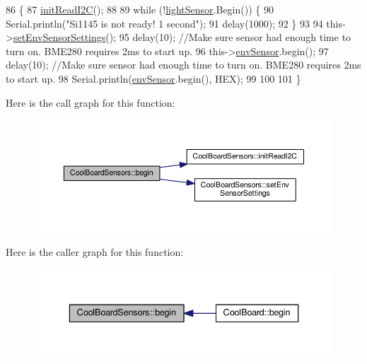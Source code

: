 \begin{DoxyCode}
86 \{       
87     \hyperlink{classCoolBoardSensors_acad6a8418c66d36868caca23c844ecb6}{initReadI2C}();
88 
89     \textcolor{keywordflow}{while} (!\hyperlink{classCoolBoardSensors_a3e397300fb707dd193e909a757bf6102}{lightSensor}.Begin()) \{
90       Serial.println(\textcolor{stringliteral}{"Si1145 is not ready!  1 second"});
91       delay(1000);
92     \}
93      
94     this->\hyperlink{classCoolBoardSensors_a406307ffd70272282d91479c7ed8d66f}{setEnvSensorSettings}();
95     delay(10);  \textcolor{comment}{//Make sure sensor had enough time to turn on. BME280 requires 2ms to start up.}
96     this->\hyperlink{classCoolBoardSensors_a868e38985e9a2412829fa2790ca13e2e}{envSensor}.begin();
97     delay(10);  \textcolor{comment}{//Make sure sensor had enough time to turn on. BME280 requires 2ms to start up.}
98     Serial.println(\hyperlink{classCoolBoardSensors_a868e38985e9a2412829fa2790ca13e2e}{envSensor}.begin(), HEX);
99 
100 
101 \}
\end{DoxyCode}
Here is the call graph for this function\+:
\nopagebreak
\begin{figure}[H]
\begin{center}
\leavevmode
\includegraphics[width=350pt]{classCoolBoardSensors_a97095823ef7c8f5290812f1405b966b3_cgraph}
\end{center}
\end{figure}
Here is the caller graph for this function\+:
\nopagebreak
\begin{figure}[H]
\begin{center}
\leavevmode
\includegraphics[width=336pt]{classCoolBoardSensors_a97095823ef7c8f5290812f1405b966b3_icgraph}
\end{center}
\end{figure}
\mbox{\label{classCoolBoardSensors_a9a218895c5423375c33c08f2c56fb23a}} 

